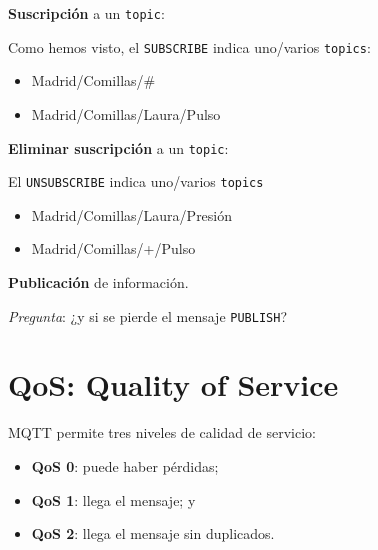 \documentclass[xcolor={x11names}]{beamer}
\begin{document}
\begin{frame}{\secname}
    \textbf{Suscripción} a un \texttt{topic}:
    \begin{figure}
        
    \end{figure}
    Como hemos visto, el \texttt{SUBSCRIBE}
    indica uno/varios \texttt{topics}:
    \begin{itemize}
        \item {\color{Firebrick3}Madrid}/{\color{Gold3}Comillas}/{\color{DodgerBlue3}\#}
        \item {\color{Firebrick3}Madrid}/{\color{Gold3}Comillas}/{\color{DodgerBlue3}Laura}/{\color{OliveDrab4}Pulso}
    \end{itemize}
\end{frame}



\begin{frame}{\secname}
    \textbf{Eliminar suscripción} a un \texttt{topic}:
    \begin{figure}
        
    \end{figure}
    El \texttt{UNSUBSCRIBE} indica uno/varios
    \texttt{topics}
    \begin{itemize}
        \item {\color{Firebrick3}Madrid}/{\color{Gold3}Comillas}/{\color{DodgerBlue3}Laura}/{\color{OliveDrab4}Presión}
        \item {\color{Firebrick3}Madrid}/{\color{Gold3}Comillas}/{\color{DodgerBlue3}+}/{\color{OliveDrab4}Pulso}
    \end{itemize}
\end{frame}





\begin{frame}{\secname}
    \textbf{Publicación} de información.
    \begin{figure}
        
    \end{figure}
    \emph{Pregunta}: ¿y si se pierde
    el mensaje \texttt{PUBLISH}?
\end{frame}



\section{QoS: Quality of Service}
\begin{frame}{\secname}
    MQTT permite tres niveles de calidad de servicio:
    \begin{itemize}
        \item \textbf{QoS 0}: puede haber pérdidas;
        \item \textbf{QoS 1}: llega el mensaje; y
        \item \textbf{QoS 2}: llega el mensaje sin duplicados.
    \end{itemize}
\end{frame}
\end{document}
